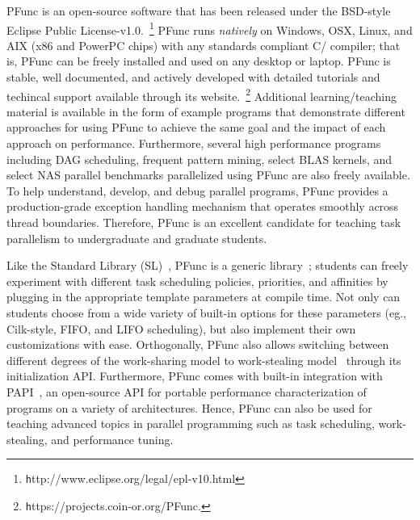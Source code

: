 \documentclass[9pt,twocolumn,letter]{article}
\begin{document}
%
%
PFunc is an open-source software that has been released under the BSD-style
Eclipse Public License-v1.0.~\footnote{\texttt
http://www.eclipse.org/legal/epl-v10.html}
%
PFunc runs \textit{natively} on Windows, OSX, Linux, and AIX (x86 and
PowerPC chips) with any standards compliant C/\Cpp{} compiler; that is, PFunc
can be freely installed and used on any desktop or laptop.
%
PFunc is stable, well documented, and actively developed with detailed
tutorials and techincal support available through its
website.~\footnote{\texttt https://projects.coin-or.org/PFunc.}
%
Additional learning/teaching material is available in the form of example
programs that demonstrate different approaches for using PFunc to achieve the
same goal and the impact of each approach on performance.
%
Furthermore, several high performance programs including DAG scheduling,
frequent pattern mining, select BLAS kernels, and select NAS parallel
benchmarks parallelized using PFunc are also freely available.
%
To help understand, develop, and debug parallel programs, PFunc provides a
production-grade exception handling mechanism that operates smoothly across
thread boundaries.
%
Therefore, PFunc is an excellent candidate for teaching task parallelism to 
undergraduate and graduate students.

%
%
Like the \Cpp{} Standard Library (SL)~\cite{musser01:_stl_ref_guide}, PFunc is
a generic library~\cite{Musser:1989:GP}; students can freely experiment with
different task scheduling policies, priorities, and affinities by plugging in
the appropriate template parameters at compile time.
%
Not only can students choose from a wide variety of built-in options for these
parameters (eg., Cilk-style, FIFO, and LIFO scheduling), but also implement
their own customizations with ease.
%
Orthogonally, PFunc also allows switching between different degrees of the
work-sharing model to work-stealing model~\cite{Blumofe94} through its
initialization API.
%
Furthermore, PFunc comes with built-in integration with PAPI~\cite{papi}, an
open-source API for portable performance characterization of programs on a
variety of architectures. 
%
Hence, PFunc can also be used for teaching advanced topics in parallel
programming such as task scheduling, work-stealing, and performance tuning. 

%
%
\end{document}
